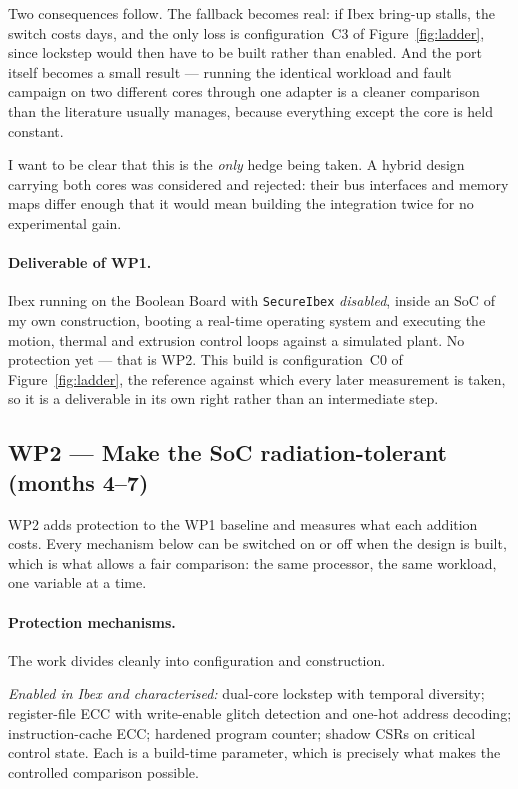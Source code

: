 \documentclass[11pt,a4paper]{article}
\begin{document}
Two consequences follow. The fallback becomes real: if Ibex bring-up stalls, the
switch costs days, and the only loss is configuration~C3 of
Figure~\ref{fig:ladder}, since lockstep would then have to be built rather than
enabled. And the port itself becomes a small result --- running the identical
workload and fault campaign on two different cores through one adapter is a
cleaner comparison than the literature usually manages, because everything except
the core is held constant.

I want to be clear that this is the \emph{only} hedge being taken. A hybrid
design carrying both cores was considered and rejected: their bus interfaces and
memory maps differ enough that it would mean building the integration twice for
no experimental gain.

\paragraph{Deliverable of WP1.}
Ibex running on the Boolean Board with \texttt{SecureIbex} \emph{disabled},
inside an SoC of my own construction, booting a real-time operating system and
executing the motion, thermal and extrusion control loops against a simulated
plant. No protection yet --- that is WP2. This build is configuration~C0 of
Figure~\ref{fig:ladder}, the reference against which every later measurement is
taken, so it is a deliverable in its own right rather than an intermediate step.

\subsection{WP2 --- Make the SoC radiation-tolerant (months 4--7)}
\label{sec:wp2}

WP2 adds protection to the WP1 baseline and measures what each addition costs.
Every mechanism below can be switched on or off when the design is built, which
is what allows a fair comparison: the same processor, the same workload, one
variable at a time.

\paragraph{Protection mechanisms.}
The work divides cleanly into configuration and construction.

\emph{Enabled in Ibex and characterised:} dual-core lockstep with temporal
diversity; register-file ECC with write-enable glitch detection and one-hot
address decoding; instruction-cache ECC; hardened program counter; shadow CSRs
on critical control state. Each is a build-time parameter, which is precisely
what makes the controlled comparison possible.
\end{document}
